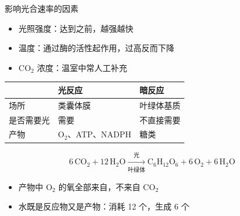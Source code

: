 \begin{notesheet}{影响光合速率的因素}

\begin{itemize}
    \item 光照强度：达到之前，越强越快 
    \item 温度：通过酶的活性起作用，过高反而下降
    \item CO$_2$ 浓度：温室中常人工补充 
\end{itemize}

\begin{notefacts}
\end{notefacts}

\begin{center}
\begin{tabular}{lll}
\toprule
 & 光反应 & 暗反应 \\
\midrule
场所 & 类囊体膜 & 叶绿体基质 \\
是否需要光 & 需要 & 不直接需要 \\
产物 & O$_2$、ATP、NADPH & 糖类 \\
\bottomrule
\end{tabular}
\end{center}

\[
6\,\mathrm{CO_2} + 12\,\mathrm{H_2O} \xrightarrow[\text{叶绿体}]{\text{光}}
\mathrm{C_6H_{12}O_6} + 6\,\mathrm{O_2} + 6\,\mathrm{H_2O}
\]
\begin{itemize}
    \item 产物中 O$_2$ 的氧全部来自，不来自 CO$_2$
    \item 水既是反应物又是产物：消耗 12 个，生成 6 个
\end{itemize}
\end{notesheet}


